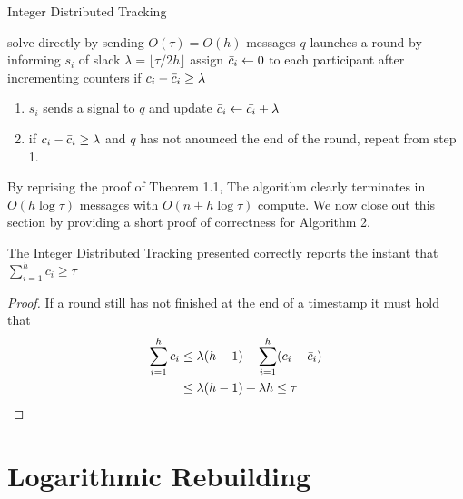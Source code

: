 \begin{algorithm}
\caption{Integer Distributed Tracking }\label{Algorithm 3}
\begin{algorithmic}
        \State solve directly by sending $O(\tau) = O(h)$ messages
        \State $q$ launches a round by informing $s_i$ of slack $\lambda = \lfloor \tau/2h \rfloor$
        \State assign $\Bar{c}_i \gets 0$ to each participant
        \State after incrementing counters if $c_i - \Bar{c}_i \geq \lambda$
        \begin{enumerate}
            \item $s_i$ sends a signal to $q$ and update $\Bar{c}_i \gets \Bar{c_i} + \lambda$
            \item if $c_i - \Bar{c}_i \geq \lambda$ and $q$ has not anounced the end of the round, repeat from step 1.
        \end{enumerate}
    \EndIf
\end{algorithmic}
\end{algorithm}
By reprising the proof of Theorem 1.1, The algorithm clearly terminates in $O(h\log\tau)$ messages with $O(n + h\log\tau)$ compute. We now close out this section by providing a short proof of correctness for Algorithm 2. 
\begin{theorem}[Correctness] The Integer Distributed Tracking presented correctly reports the instant that $\sum_{i=1}^{h}c_i \geq \tau$
\end{theorem}
\begin{proof}
    If a round still has not finished at the end of a timestamp it must hold that 
    \begin{align*}
        \sum_{i=1}^{h}c_i &\leq \lambda (h-1) + \sum_{i=1}^{h}(c_i - \Bar{c}_i) \\
        &\leq \lambda(h-1) + \lambda h \leq \tau
    \end{align*}
\end{proof}


\section{Logarithmic Rebuilding}